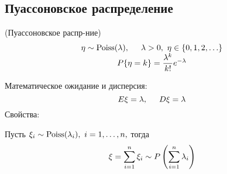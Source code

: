 \begin{multicols}{2}
    \subsection*{Пуассоновское распределение}
    \begin{definition}{(Пуассоновское распр-ние)}{}
        \[
        \begin{array}{c}
        \eta \sim \operatorname{Poiss}(\lambda), \hspace{0.5cm} \lambda > 0, \ \eta \in \{ 0, 1, 2,\ldots\} \\
        P\{\eta = k\} = \dfrac{\lambda^k}{k!} e^{-\lambda}
        \end{array}
        \]
    \end{definition}
    Математическое ожидание и дисперсия:
    \[
    E\xi = \lambda, \hspace{0.5cm} D\xi = \lambda
    \]
    Свойства:
    \begin{enumerate*}
        \item Пусть $\xi_i \sim \operatorname{Poiss}(\lambda_i), \ i = 1, \ldots, n,$
        тогда
        \[
        \xi = \sum\limits_{i = 1}^n \xi_i \sim P\left(\sum\limits_{i = 1}^n \lambda_i \right)
        \]
    \end{enumerate*}

\end{multicols}
